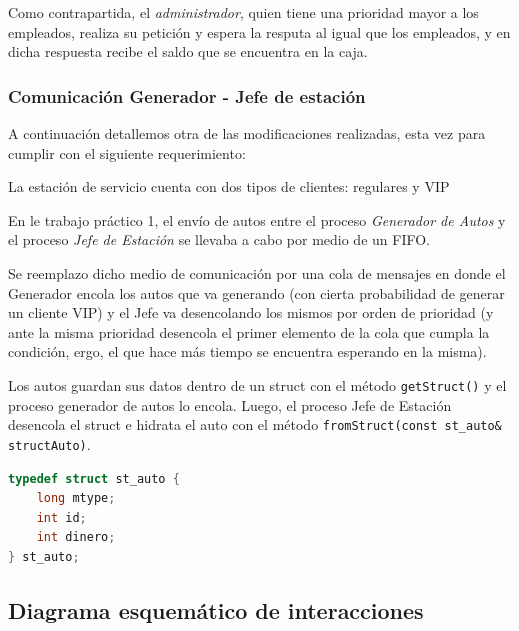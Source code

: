 \documentclass[12pt,a4paper,spanish]{article}
\begin{document}
	Como contrapartida, el \emph{administrador}, quien tiene una prioridad mayor a los empleados, realiza su
	petición y espera la resputa al igual que los empleados, y en dicha respuesta recibe el saldo que se 
	encuentra en la caja.

	\subsubsection{Comunicación Generador - Jefe de estación}

	A continuación detallemos otra de las modificaciones realizadas, esta vez para cumplir con el siguiente requerimiento:
	
	\begin{framed}
	La estación de servicio cuenta con dos tipos de clientes: regulares y VIP
	\end{framed}

	En le trabajo práctico 1, el envío de autos entre el proceso \emph{Generador de Autos} y el proceso \emph{Jefe de Estación}
	se llevaba a cabo por medio de un FIFO. 

	Se reemplazo dicho medio de comunicación por una cola de mensajes en donde el Generador encola los autos que va generando 
	(con cierta probabilidad de generar un cliente VIP) y el Jefe va desencolando los mismos por orden de prioridad (y ante la misma prioridad desencola el primer elemento de la cola que cumpla la condición, ergo, el que hace más tiempo se encuentra 
	esperando en la misma).

	Los autos guardan sus datos dentro de un struct con el método \texttt{getStruct()} y el proceso generador de autos lo encola.
	Luego, el proceso Jefe de Estación desencola el struct e hidrata el auto con el método \texttt{fromStruct(const st\_auto\& structAuto)}.

\begin{center}
		\begin{varwidth}{0.5\textwidth}
			\begin{lstlisting}[frame=single, language=C, caption={Autos encoladas}]
	typedef struct st_auto {
	long mtype;
	int id;	
	int dinero;
} st_auto;
		\end{lstlisting}
	\end{varwidth}
\end{center}
	\newpage
	\subsection{Diagrama esquemático de interacciones}
	
\end{document}
